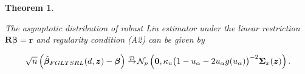\documentclass[10pt,twoside]{article}
\newtheorem{thm}[dfn]{Theorem}
\numberwithin{equation}{section}
\begin{document}
\begin{thm}\label{th1}

The asymptotic distribution of robust Liu estimator under the linear restriction $\boldsymbol{R}\boldsymbol{\beta}=\boldsymbol{r}$ and regularity condition (A2) can be given by

\begin{eqnarray}\label{eq335}

\sqrt n\left(\hat{\boldsymbol\beta}_{FGLTSRL}(d,\boldsymbol z)-\boldsymbol\beta\right)\rightarrow^{\hspace{-.3cm}\mathcal D}\mathcal{N}_p\left(\boldsymbol{0},\kappa_u\big(1-u_\alpha-2u_\alpha g(u_\alpha)\big)^{-2} \boldsymbol{\Sigma}_x(\boldsymbol z)\right).

\end{eqnarray}

\end{thm}

















\end{document}
